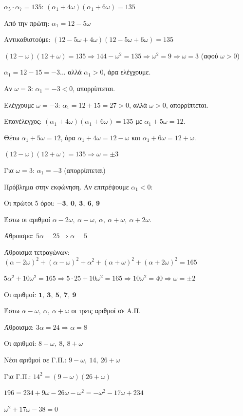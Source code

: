 \documentclass[11pt,a4paper,modern]{FFExercises}
\begin{document}
$\alpha_5\cdot\alpha_7=135$: $(\alpha_1+4\omega)(\alpha_1+6\omega)=135$

Από την πρώτη: $\alpha_1=12-5\omega$

Αντικαθιστούμε: $(12-5\omega+4\omega)(12-5\omega+6\omega)=135$

$(12-\omega)(12+\omega)=135 \Rightarrow 144-\omega^2=135 \Rightarrow \omega^2=9 \Rightarrow \omega=3$ (αφού $\omega>0$)

$\alpha_1=12-15=-3$... αλλά $\alpha_1>0$, άρα ελέγχουμε.

Αν $\omega=3$: $\alpha_1=-3<0$, απορρίπτεται.

Ελέγχουμε $\omega=-3$: $\alpha_1=12+15=27>0$, αλλά $\omega>0$, απορρίπτεται.

Επανέλεγχος: $(\alpha_1+4\omega)(\alpha_1+6\omega)=135$ με $\alpha_1+5\omega=12$.

Θέτω $\alpha_1+5\omega=12$, άρα $\alpha_1+4\omega=12-\omega$ και $\alpha_1+6\omega=12+\omega$.

$(12-\omega)(12+\omega)=135 \Rightarrow \omega=\pm 3$

Για $\omega=3$: $\alpha_1=-3$ (απορρίπτεται)

Πρόβλημα στην εκφώνηση. Αν επιτρέψουμε $\alpha_1<0$:

Οι πρώτοι 5 όροι: $\boldsymbol{-3,\ 0,\ 3,\ 6,\ 9}$

\lysh[51]
Έστω οι αριθμοί $\alpha-2\omega,\ \alpha-\omega,\ \alpha,\ \alpha+\omega,\ \alpha+2\omega$.

Άθροισμα: $5\alpha=25 \Rightarrow \alpha=5$

Άθροισμα τετραγώνων: 
$(\alpha-2\omega)^2+(\alpha-\omega)^2+\alpha^2+(\alpha+\omega)^2+(\alpha+2\omega)^2=165$

$5\alpha^2+10\omega^2=165 \Rightarrow 5\cdot 25+10\omega^2=165 \Rightarrow 10\omega^2=40 \Rightarrow \omega=\pm 2$

Οι αριθμοί: $\boldsymbol{1,\ 3,\ 5,\ 7,\ 9}$

\lysh[52]
Έστω $\alpha-\omega,\ \alpha,\ \alpha+\omega$ οι τρεις αριθμοί σε Α.Π.

Άθροισμα: $3\alpha=24 \Rightarrow \alpha=8$

Οι αριθμοί: $8-\omega,\ 8,\ 8+\omega$

Νέοι αριθμοί σε Γ.Π.: $9-\omega,\ 14,\ 26+\omega$

Για Γ.Π.: $14^2=(9-\omega)(26+\omega)$

$196=234+9\omega-26\omega-\omega^2=-\omega^2-17\omega+234$

$\omega^2+17\omega-38=0$
\end{document}
